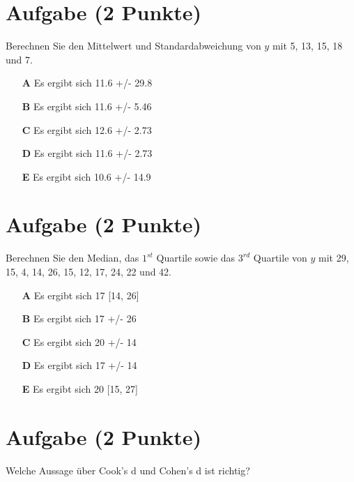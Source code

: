 \documentclass[a4paper, 9pt]{scrartcl}\usepackage[]{graphicx}\usepackage[]{xcolor}
\begin{document}
\section{Aufgabe \hfill (2 Punkte)}




Berechnen Sie den Mittelwert und Standardabweichung von $y$ mit 5, 13, 15, 18 und 7.



\begin{enumerate}
\item [\textbf{A} \msquare] Es ergibt sich 11.6 +/- 29.8
\item [\textbf{B} \msquare] Es ergibt sich 11.6 +/- 5.46
\item [\textbf{C} \msquare] Es ergibt sich 12.6 +/- 2.73
\item [\textbf{D} \msquare] Es ergibt sich 11.6 +/- 2.73
\item [\textbf{E} \msquare] Es ergibt sich 10.6 +/- 14.9
\end{enumerate} 

\section{Aufgabe \hfill (2 Punkte)}




Berechnen Sie den Median, das $1^{st}$ Quartile sowie das $3^{rd}$ Quartile von $y$ mit 29, 15, 4, 14, 26, 15, 12, 17, 24, 22 und 42.



\begin{enumerate}
\item [\textbf{A} \msquare] Es ergibt sich 17 [14, 26]
\item [\textbf{B} \msquare] Es ergibt sich 17 +/- 26
\item [\textbf{C} \msquare] Es ergibt sich 20 +/- 14
\item [\textbf{D} \msquare] Es ergibt sich 17 +/- 14
\item [\textbf{E} \msquare] Es ergibt sich 20 [15, 27]
\end{enumerate} 

\section{Aufgabe \hfill (2 Punkte)}

Welche Aussage {\"u}ber Cook's d und Cohen's d ist richtig? 
\end{document}
